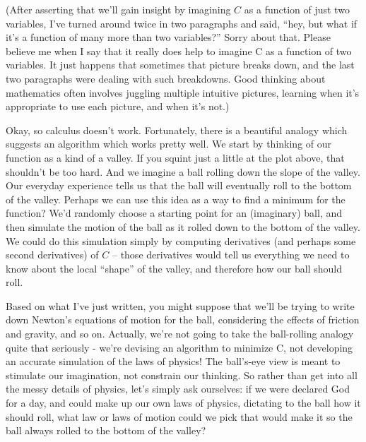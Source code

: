 \documentclass[a4paper,twoside,10pt]{book}
\begin{document}
(After asserting that we'll gain insight by imagining $C$ as a function of just two variables, I've turned around twice in two paragraphs and said, ``hey, but what if it's a function of many more than two variables?'' Sorry about that. Please believe me when I say that it really does help to imagine C as a function of two variables. It just happens that sometimes that picture breaks down, and the last two paragraphs were dealing with such breakdowns. Good thinking about mathematics often involves juggling multiple intuitive pictures, learning when it's appropriate to use each picture, and when it's not.)


Okay, so calculus doesn't work. Fortunately, there is a beautiful analogy which suggests an algorithm which works pretty well. We start by thinking of our function as a kind of a valley. If you squint just a little at the plot above, that shouldn't be too hard. And we imagine a ball rolling down the slope of the valley. Our everyday experience tells us that the ball will eventually roll to the bottom of the valley. Perhaps we can use this idea as a way to find a minimum for the function? We'd randomly choose a starting point for an (imaginary) ball, and then simulate the motion of the ball as it rolled down to the bottom of the valley. We could do this simulation simply by computing derivatives (and perhaps some second derivatives) of $C$ -- those derivatives would tell us everything we need to know about the local ``shape'' of the valley, and therefore how our ball should roll.

Based on what I've just written, you might suppose that we'll be trying to write down Newton's equations of motion for the ball, considering the effects of friction and gravity, and so on. Actually, we're not going to take the ball-rolling analogy quite that seriously - we're devising an algorithm to minimize C, not developing an accurate simulation of the laws of physics! The ball's-eye view is meant to stimulate our imagination, not constrain our thinking. So rather than get into all the messy details of physics, let's simply ask ourselves: if we were declared God for a day, and could make up our own laws of physics, dictating to the ball how it should roll, what law or laws of motion could we pick that would make it so the ball always rolled to the bottom of the valley?
\end{document}
